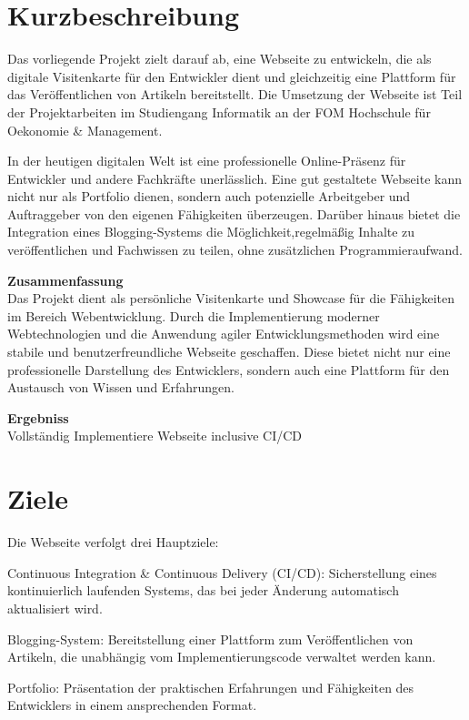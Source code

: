 \section{Kurzbeschreibung}
Das vorliegende Projekt zielt darauf ab, eine Webseite zu entwickeln, die als digitale Visitenkarte für den Entwickler dient und gleichzeitig eine Plattform für das Veröffentlichen von Artikeln bereitstellt. 
Die Umsetzung der Webseite ist Teil der Projektarbeiten im Studiengang Informatik an der FOM Hochschule für Oekonomie \& Management.

In der heutigen digitalen Welt ist eine professionelle Online-Präsenz für Entwickler und andere Fachkräfte unerlässlich. Eine gut gestaltete 
Webseite kann nicht nur als Portfolio dienen, sondern auch potenzielle Arbeitgeber und Auftraggeber von den eigenen Fähigkeiten überzeugen. Darüber hinaus 
bietet die Integration eines Blogging-Systems die Möglichkeit,regelmäßig Inhalte zu veröffentlichen und Fachwissen zu teilen, ohne zusätzlichen Programmieraufwand.

\textbf{ Zusammenfassung } \\
Das Projekt dient als persönliche Visitenkarte und Showcase für die Fähigkeiten im Bereich Webentwicklung. Durch die Implementierung moderner 
Webtechnologien und die Anwendung agiler Entwicklungsmethoden wird eine stabile und benutzerfreundliche Webseite geschaffen.
Diese bietet nicht nur eine professionelle Darstellung des Entwicklers, sondern auch eine Plattform für den Austausch von Wissen und Erfahrungen.

\textbf{ Ergebniss } \\
Vollständig Implementiere Webseite inclusive CI/CD

\section{Ziele}
Die Webseite verfolgt drei Hauptziele:

\begin{itemize*}
    \item Continuous Integration \& Continuous Delivery (CI/CD): Sicherstellung eines kontinuierlich laufenden Systems, das bei jeder Änderung automatisch aktualisiert wird.
    \item Blogging-System: Bereitstellung einer Plattform zum Veröffentlichen von Artikeln, die unabhängig vom Implementierungscode verwaltet werden kann.
    \item Portfolio: Präsentation der praktischen Erfahrungen und Fähigkeiten des Entwicklers in einem ansprechenden Format.

\end{itemize*}

